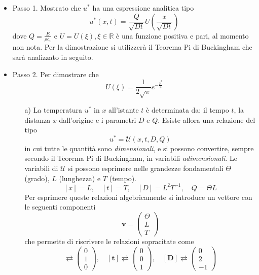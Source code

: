 \documentclass[a4paper,12pt, draft]{article}
\theoremstyle{break}
\numberwithin{equation}{section}
\begin{document}
\begin{itemize}
\item Passo 1. Mostrato che $u^*$ ha una espressione analitica tipo
\begin{equation}
u^*(x, t) = \frac{Q}{\sqrt{Dt}} U \left(\frac{x}{\sqrt{Dt}}\right)
\end{equation}
dove $Q = \frac{E}{\rho c_v}$ e $U = U(\xi), \xi \in \mathbb{R}$ è una funzione positiva e pari, al momento non nota. Per la dimostrazione si utilizzerà il Teorema Pi di Buckingham che sarà analizzato in seguito.
\item Passo 2. Per dimostrare che 
\begin{equation}
U(\xi) = \frac{1}{2\sqrt{\pi}}e^{-\frac{\xi^2}{4}}
\end{equation}
\begin{itemize}
\item[a)] La temperatura $u^*$ in $x$ all'istante $t$ è determinata da: il tempo $t$, la distanza $x$ dall'origine e i parametri $D \mbox{ e } Q$. Esiste allora una relazione del tipo
\begin{equation}
u^* = \mathcal{U}(x, t, D, Q)
\end{equation}
in cui tutte le quantità sono \emph{dimensionali}, e si possono convertire, sempre secondo il Teorema Pi di Buckingham, in variabili \emph{adimensionali}.
Le variabili di $\mathcal{U}$ si possono esprimere nelle grandezze fondamentali $\Theta$ (grado), $L$ (lunghezza) e $T$ (tempo).
$$
[x] = L,\quad [t]=T,\quad [D] = L^2T^{-1}, \quad Q = \Theta L
$$
Per esprimere queste relazioni algebricamente si introduce un vettore con le seguenti componenti $$\mathbf{v} =\begin{pmatrix}
\Theta \\
L \\
T
\end{pmatrix}$$
che permette di riscrivere le relazioni sopracitate come
\begin{equation}
[\bm{x}] \rightleftarrows \begin{pmatrix}
0\\ 1 \\ 0
\end{pmatrix}, \quad
[\mathbf{t}] \rightleftarrows \begin{pmatrix}
0\\ 0 \\ 1
\end{pmatrix}, \quad
[\mathbf{D}] \rightleftarrows \begin{pmatrix}
0\\ 2 \\ -1

\end{pmatrix}
\end{equation}
\end{itemize}
\end{itemize}
\end{document}
